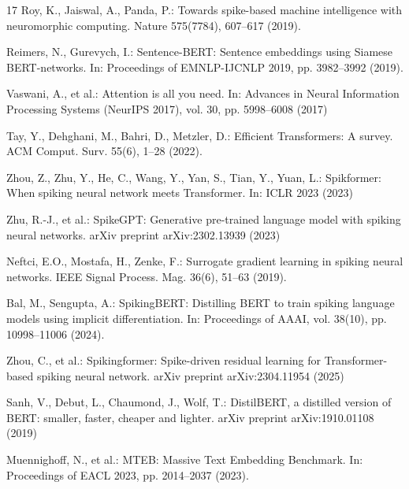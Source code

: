 \documentclass[runningheads]{llncs}
\begin{document}
\begin{thebibliography}{17}
Roy, K., Jaiswal, A., Panda, P.: Towards spike-based machine intelligence with neuromorphic computing. Nature 575(7784), 607--617 (2019). 

Reimers, N., Gurevych, I.: Sentence-BERT: Sentence embeddings using Siamese BERT-networks. In: Proceedings of EMNLP-IJCNLP 2019, pp. 3982--3992 (2019). 

Vaswani, A., et al.: Attention is all you need. In: Advances in Neural Information Processing Systems (NeurIPS 2017), vol. 30, pp. 5998--6008 (2017)

Tay, Y., Dehghani, M., Bahri, D., Metzler, D.: Efficient Transformers: A survey. ACM Comput. Surv. 55(6), 1--28 (2022). 

Zhou, Z., Zhu, Y., He, C., Wang, Y., Yan, S., Tian, Y., Yuan, L.: Spikformer: When spiking neural network meets Transformer. In: ICLR 2023 (2023)

Zhu, R.-J., et al.: SpikeGPT: Generative pre-trained language model with spiking neural networks. arXiv preprint arXiv:2302.13939 (2023)

Neftci, E.O., Mostafa, H., Zenke, F.: Surrogate gradient learning in spiking neural networks. IEEE Signal Process. Mag. 36(6), 51--63 (2019). 

Bal, M., Sengupta, A.: SpikingBERT: Distilling BERT to train spiking language models using implicit differentiation. In: Proceedings of AAAI, vol. 38(10), pp. 10998--11006 (2024). 

Zhou, C., et al.: Spikingformer: Spike-driven residual learning for Transformer-based spiking neural network. arXiv preprint arXiv:2304.11954 (2025)

Sanh, V., Debut, L., Chaumond, J., Wolf, T.: DistilBERT, a distilled version of BERT: smaller, faster, cheaper and lighter. arXiv preprint arXiv:1910.01108 (2019)

Muennighoff, N., et al.: MTEB: Massive Text Embedding Benchmark. In: Proceedings of EACL 2023, pp. 2014--2037 (2023). 


\end{thebibliography}
\end{document}
